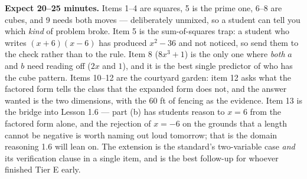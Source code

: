\documentclass[10pt]{article}
\begin{document}
\begin{teachernote}[Homework]
    \textbf{Expect 20--25 minutes.} Items 1--4 are squares, 5 is the prime one, 6--8 are cubes, and
    9 needs both moves --- deliberately unmixed, so a student can tell you which \emph{kind} of
    problem broke. Item 5 is the sum-of-squares trap: a student who writes $(x+6)(x-6)$ has produced
    $x^2-36$ and not noticed, so send them to the check rather than to the rule. Item 8 ($8x^3+1$)
    is the only one where \emph{both} $a$ and $b$ need reading off ($2x$ and $1$), and it is the
    best single predictor of who has the cube pattern. Items 10--12 are the courtyard garden: item
    12 asks what the factored form tells the class that the expanded form does not, and the answer
    wanted is the two dimensions, with the $60$ ft of fencing as the evidence. Item 13 is the bridge
    into Lesson 1.6 --- part (b) has students reason to $x=6$ from the factored form alone, and the
    rejection of $x=-6$ on the grounds that a length cannot be negative is worth naming out loud
    tomorrow; that is the domain reasoning 1.6 will lean on. The extension is the standard's
    two-variable case \emph{and} its verification clause in a single item, and is the best follow-up
    for whoever finished Tier E early.
\end{teachernote}
\end{document}
